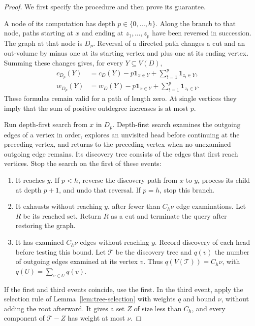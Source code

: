 \documentclass[11pt]{article}
\theoremstyle{definition}
\theoremstyle{remark}
\newcommand{\one}{\mathbf 1}
\begin{document}
\begin{proof}
We first specify the procedure and then prove its guarantee.

A node of its computation has depth \(p\in\{0,\ldots,h\}\). Along the branch to that node, paths starting at \(x\) and ending at \(z_1,\ldots,z_p\) have been reversed in succession. The graph at that node is \(D_p\). Reversal of a directed path changes a cut and an out-volume by minus one at its starting vertex and plus one at its ending vertex. Summing these changes gives, for every \(Y\subseteq V(D)\),
\begin{align}
 c_{D_p}(Y)&=c_D(Y)-p\one_{x\in Y}+\sum_{t=1}^p\one_{z_t\in Y},\label{eq:local-cut}\\
 w_{D_p}(Y)&=w_D(Y)-p\one_{x\in Y}+\sum_{t=1}^p\one_{z_t\in Y}.
 \label{eq:local-volume}
\end{align}
These formulas remain valid for a path of length zero. At single vertices they imply that the sum of positive outdegree increases is at most \(p\).

Run depth-first search from \(x\) in \(D_p\). Depth-first search examines the outgoing edges of a vertex in order, explores an unvisited head before continuing at the preceding vertex, and returns to the preceding vertex when no unexamined outgoing edge remains. Its discovery tree consists of the edges that first reach vertices. Stop the search on the first of these events:
\begin{enumerate}
\item It reaches \(y\). If \(p<h\), reverse the discovery path from \(x\) to \(y\), process its child at depth \(p+1\), and undo that reversal. If \(p=h\), stop this branch.
\item It exhausts without reaching \(y\), after fewer than \(C_h\nu\) edge examinations. Let \(R\) be its reached set. Return \(R\) as a cut and terminate the query after restoring the graph.
\item It has examined \(C_h\nu\) edges without reaching \(y\). Record discovery of each head before testing this bound. Let \(\mathcal T\) be the discovery tree and \(q(v)\) the number of outgoing edges examined at its vertex \(v\). Thus \(q(V(\mathcal T))=C_h\nu\), with \(q(U)=\sum_{v\in U}q(v)\).
\end{enumerate}
If the first and third events coincide, use the first. In the third event, apply the selection rule of Lemma~\ref{lem:tree-selection} with weights \(q\) and bound \(\nu\), without adding the root afterward. It gives a set \(Z\) of size less than \(C_h\), and every component of \(\mathcal T-Z\) has weight at most \(\nu\).


\end{proof}
\end{document}
